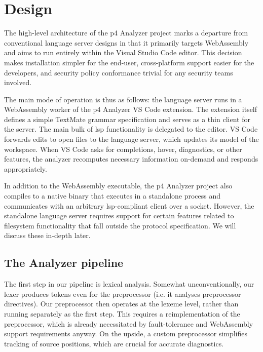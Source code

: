\chapter{Design} \label{ch:design}

The high-level architecture of the \acrshort{p4} Analyzer project marks a
departure from conventional language server designs in that it primarily targets
WebAssembly and aims to run entirely within the Visual Studio Code editor. This
decision makes installation simpler for the end-user, cross-platform support
easier for the developers, and security policy conformance trivial for any
security teams involved.

The main mode of operation is thus as follows: the language server runs in a
WebAssembly worker of the \acrshort{p4} Analyzer VS Code extension. The
extension itself defines a simple TextMate\cite{textmate} grammar specification
and serves as a thin client for the server. The main bulk of \acrshort{lsp}
functionality is delegated to the editor. VS Code forwards edits to open files
to the language server, which updates its model of the workspace. When VS Code
asks for completions, hover, diagnostics, or other features, the analyzer
recomputes necessary information on-demand and responds appropriately.

In addition to the WebAssembly executable, the \acrshort{p4} Analyzer project
also compiles to a native binary that executes in a standalone process and
communicates with an arbitrary \acrshort{lsp}-compliant client over a socket.
However, the standalone language server requires support for certain features
related to filesystem functionality that fall outside the protocol
specification. We will discuss these in-depth later.

\section{The  Analyzer pipeline}

The first step in our pipeline is lexical analysis. Somewhat unconventionally,
our lexer produces tokens even for the preprocessor (i.e. it analyses
preprocessor directives). Our preprocessor then operates at the lexeme level,
rather than running separately as the first step. This requires a
reimplementation of the preprocessor, which is already necessitated by
fault-tolerance and WebAssembly support requirements anyway. On the upside, a
custom preprocessor simplifies tracking of source positions, which are crucial
for accurate diagnostics.

